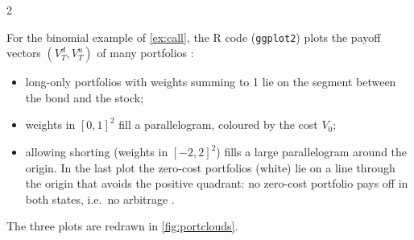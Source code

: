 \begin{paracol}{2}
\begin{casestudy}
For the binomial example of \cref{ex:call}, the R code (\texttt{ggplot2}) plots the payoff vectors
$(V_T^d,V_T^u)$ of many portfolios :
\begin{itemize}
  \item long-only portfolios with weights summing
      to 1 lie on the segment between the bond and the stock;
  \item weights in $[0,1]^2$ fill a parallelogram,
      coloured by the cost $V_0$;
  \item allowing shorting (weights in $[-2,2]^2$) fills a large parallelogram
      around the origin. In the last plot the zero-cost portfolios (white) lie on a line through the origin
      that avoids the positive quadrant: no zero-cost portfolio pays off in both states, i.e.\ no arbitrage
      .
\end{itemize}
The three plots are redrawn in \cref{fig:portclouds}.
\end{casestudy}


\end{paracol}
